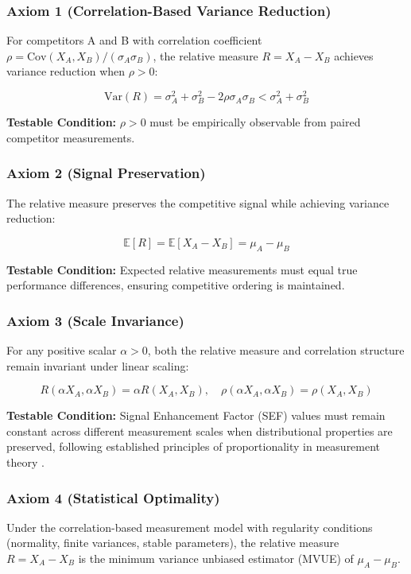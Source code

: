 \subsubsection{Axiom 1 (Correlation-Based Variance Reduction)}
For competitors A and B with correlation coefficient $\rho = \text{Cov}(X_A, X_B)/(\sigma_A \sigma_B)$, the relative measure $R = X_A - X_B$ achieves variance reduction when $\rho > 0$:

$$\text{Var}(R) = \sigma_A^2 + \sigma_B^2 - 2\rho\sigma_A\sigma_B < \sigma_A^2 + \sigma_B^2$$

\textbf{Testable Condition:} $\rho > 0$ must be empirically observable from paired competitor measurements.

\subsubsection{Axiom 2 (Signal Preservation)}
The relative measure preserves the competitive signal while achieving variance reduction:

$$\mathbb{E}[R] = \mathbb{E}[X_A - X_B] = \mu_A - \mu_B$$

\textbf{Testable Condition:} Expected relative measurements must equal true performance differences, ensuring competitive ordering is maintained.

\subsubsection{Axiom 3 (Scale Invariance)}
For any positive scalar $\alpha > 0$, both the relative measure and correlation structure remain invariant under linear scaling:

$$R(\alpha X_A, \alpha X_B) = \alpha R(X_A, X_B), \quad \rho(\alpha X_A, \alpha X_B) = \rho(X_A, X_B)$$

\textbf{Testable Condition:} Signal Enhancement Factor (SEF) values must remain constant across different measurement scales when distributional properties are preserved, following established principles of proportionality in measurement theory \cite{barak2012proportionality}.

\subsubsection{Axiom 4 (Statistical Optimality)}
Under the correlation-based measurement model with regularity conditions (normality, finite variances, stable parameters), the relative measure $R = X_A - X_B$ is the minimum variance unbiased estimator (MVUE) of $\mu_A - \mu_B$.

